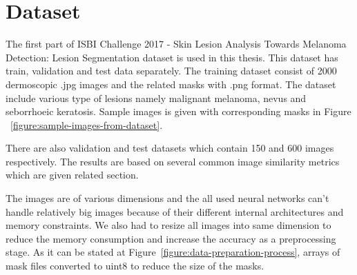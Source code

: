 \section{Dataset}\label{section:dataset}

The first part of ISBI Challenge 2017 \cite{codella2018skin} - Skin Lesion Analysis Towards Melanoma Detection: Lesion Segmentation dataset is used in this thesis.
This dataset has train, validation and test data separately. The training dataset consist of 2000 dermoscopic .jpg images and the related masks with .png format.
The dataset include various type of lesions namely malignant melanoma, nevus and seborrhoeic keratosis.
Sample images is given with corresponding masks in Figure ~\ref{figure:sample-images-from-dataset}.



There are also validation and test datasets which contain 150 and 600 images respectively.
The results are based on several common image similarity metrics which are given related section.



The images are of various dimensions and the all used neural networks can't handle relatively big images because of their different internal architectures and memory constraints.
We also had to resize all images into same dimension to reduce the memory consumption and increase the accuracy as a preprocessing stage.
As it can be stated at Figure~\ref{figure:data-preparation-process}, arrays of mask files converted to uint8 to reduce the size of the masks.
